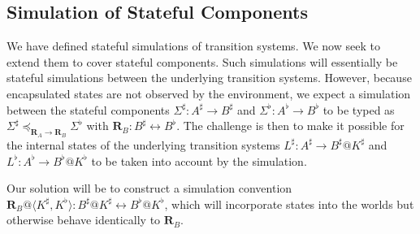 \documentclass[acmsmall,screen,review,anonymous]{acmart}
\renewcommand{\preceq}{\preccurlyeq}
\begin{document}


\subsection{Simulation of Stateful Components} %

We have defined stateful simulations of transition systems.
We now seek to extend them to cover stateful components.
Such simulations will essentially be
stateful simulations between the underlying transition systems.
However,
because encapsulated states are not observed by the environment,
we expect a simulation between the stateful components
$\Sigma^\sharp : A^\sharp \rightarrow B^\sharp$ and
$\Sigma^\flat : A^\flat \rightarrow B^\flat$
to be typed as
$
  \Sigma^\sharp \preceq_{\mathbf{R}_A \rightarrow \mathbf{R}_B}
  \Sigma^\flat
$
with $\mathbf{R}_B : B^\sharp \leftrightarrow B^\flat$.
The challenge is then to make it possible for
the internal states of the underlying transition systems
$L^\sharp : A^\sharp \rightarrow B^\sharp@K^\sharp$
and
$L^\flat : A^\flat \rightarrow B^\flat@K^\flat$
to be taken into account by the simulation.

Our solution will be to construct a simulation convention
$\mathbf{R}_B@\langle K^\sharp, K^\flat \rangle :
 B^\sharp@K^\sharp \leftrightarrow B^\flat@K^\flat$,
which will incorporate states into the worlds
but otherwise behave identically to $\mathbf{R}_B$.
\end{document}
